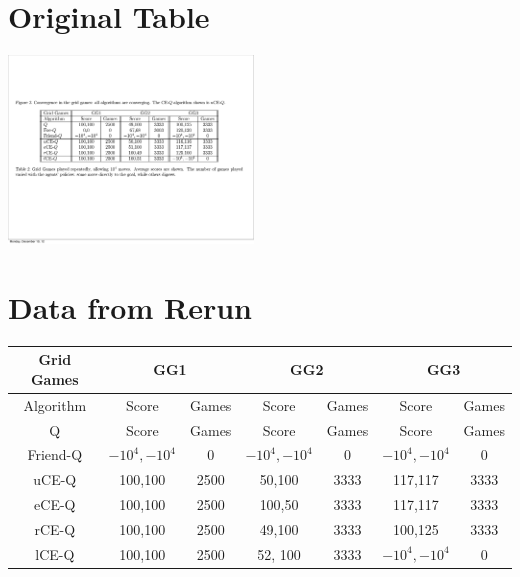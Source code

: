 \section{Original Table}
\includegraphics[height=50mm]{text/pic_CEQ.pdf}


\section{Data from Rerun}
\begin{tabular}{||c||c|c||c|c||c|c||}
	\hline
	Grid Games&  \multicolumn{2}{|c||}{GG1} &
	 \multicolumn{2}{|c||}{GG2}  & \multicolumn{2}{|c||}{GG3}  \\ \hline
	Algorithm & Score & Games & Score & Games & Score & Games \\ \hline \hline
	Q & Score & Games & Score & Games & Score & Games \\ \hline
	Friend-Q & $-10^{4},-10^{4}$ & 0 & $-10^{4},-10^{4}$ & 0 & $-10^{4},-10^{4}$ & 0 \\ \hline \hline
	uCE-Q & 100,100 & 2500 & 50,100 & 3333 & 117,117 & 3333 \\ \hline
	eCE-Q & 100,100 & 2500 & 100,50 & 3333 & 117,117 & 3333 \\ \hline
	rCE-Q & 100,100 & 2500 & 49,100 & 3333 & 100,125 & 3333 \\ \hline \hline
	lCE-Q & 100,100 & 2500 & 52, 100 & 3333 & $-10^{4},-10^{4}$ & 0 \\ \hline 
	
\end{tabular}

